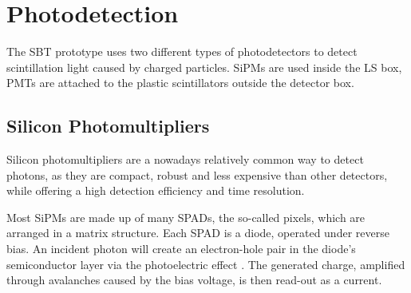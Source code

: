 	
	
	


\section{Photodetection} \label{photodetectors}

The \ac{SBT} prototype uses two different types of photodetectors to detect scintillation light caused by charged particles. \acsp{SiPM} are used inside the \ac{LS} box, \acsp{PMT} are attached to the plastic scintillators outside the detector box.


\subsection{Silicon Photomultipliers}  

Silicon photomultipliers are a nowadays relatively common way to detect photons, as they are compact, robust and less expensive than other detectors, while offering a high detection efficiency and time resolution.

Most \acsp{SiPM} are made up of many \acfp{SPAD}, the so-called pixels, which are arranged in a matrix structure. Each \ac{SPAD} is a diode, operated under reverse bias. An incident photon will create an electron-hole pair in the diode's semiconductor layer via the photoelectric effect \cite{HAMAMATSU-SIPM}. The generated charge, amplified through avalanches caused by the bias voltage, is then read-out as a current.

